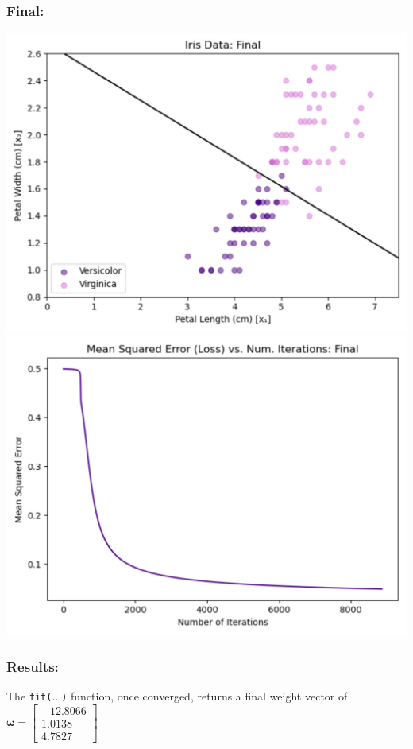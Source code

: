 \documentclass{article} %
\begin{document}
\subsubsection*{Final: }
\begin{center}
    \includegraphics[scale = 0.35]{3c_plot_final_db.png} \includegraphics[scale = 0.35]{3c_plot_final_loss.png}
\end{center}
\subsubsection*{Results:}
The \texttt{fit($\hdots$)} function, once converged, returns a final weight vector of $\boldsymbol{\omega}=\begin{bmatrix}-12.8066\\1.0138\\4.7827\end{bmatrix}$
\end{document}
